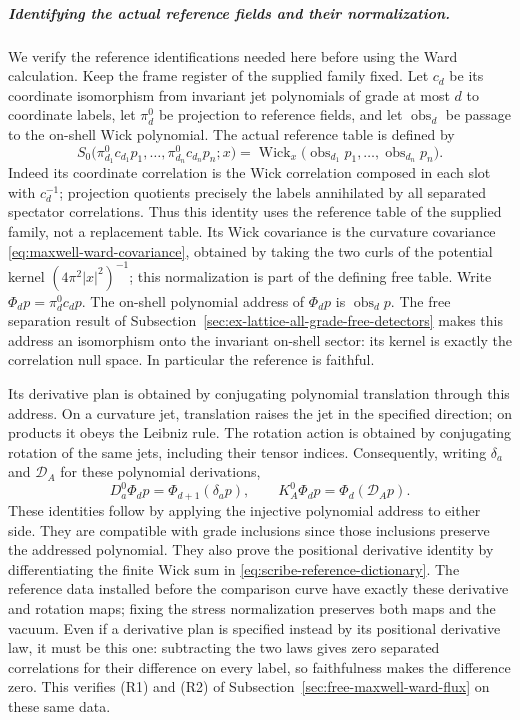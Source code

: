 \subparagraph{Identifying the actual reference fields and their normalization.}
We verify the reference identifications needed here before using the
Ward calculation. Keep the frame register of the supplied family fixed.
Let $c_d$ be its coordinate isomorphism from invariant jet polynomials
of grade at most $d$ to coordinate labels, let $\pi_d^0$ be projection
to reference fields, and let $\operatorname{obs}_d$ be passage to the
on-shell Wick polynomial. The actual reference table is defined by
\begin{equation}\label{eq:scribe-reference-dictionary}
 S_0\bigl(\pi_{d_1}^0c_{d_1}p_1,\ldots,
             \pi_{d_n}^0c_{d_n}p_n;x\bigr)
 =\operatorname{Wick}_x\bigl(\operatorname{obs}_{d_1}p_1,
                    \ldots,\operatorname{obs}_{d_n}p_n\bigr).
\end{equation}
Indeed its coordinate correlation is the Wick correlation composed in
each slot with $c_d^{-1}$; projection quotients precisely the labels
annihilated by all separated spectator correlations. Thus this identity
uses the reference table of the supplied family, not a replacement
table. Its Wick covariance is the curvature covariance
\eqref{eq:maxwell-ward-covariance}, obtained by taking the two curls
of the potential kernel $(4\pi^2|x|^2)^{-1}$; this normalization is part
of the defining free table. Write $\Phi_dp=\pi_d^0c_dp$. The on-shell polynomial address of
$\Phi_dp$ is $\operatorname{obs}_dp$. The free separation result of
Subsection~\ref{sec:ex-lattice-all-grade-free-detectors} makes this address an
isomorphism onto the invariant on-shell sector: its kernel is exactly
the correlation null space. In particular the reference is faithful.

Its derivative plan is obtained by conjugating polynomial translation
through this address. On a curvature jet, translation raises the jet
in the specified direction; on products it obeys the Leibniz rule.
The rotation action is obtained by conjugating rotation of the same
jets, including their tensor indices. Consequently, writing
$\delta_a$ and $\mathscr D_A$ for these polynomial derivations,
\begin{equation}\label{eq:scribe-reference-derivatives}
 D_a^0\Phi_dp=\Phi_{d+1}(\delta_ap),\qquad
 K_A^0\Phi_dp=\Phi_d(\mathscr D_Ap).
\end{equation}
These identities follow by applying the injective polynomial address
to either side. They are compatible with grade inclusions since those
inclusions preserve the addressed polynomial. They also prove the
positional derivative identity by differentiating the finite Wick
sum in \eqref{eq:scribe-reference-dictionary}. The reference data
installed before the comparison curve have exactly these derivative
and rotation maps; fixing the stress normalization preserves both maps
and the vacuum. Even if a derivative plan is specified instead by its
positional derivative law, it must be this one: subtracting the two
laws gives zero separated correlations for their difference on every
label, so faithfulness makes the difference zero. This verifies (R1)
and (R2) of Subsection~\ref{sec:free-maxwell-ward-flux} on these same data.

